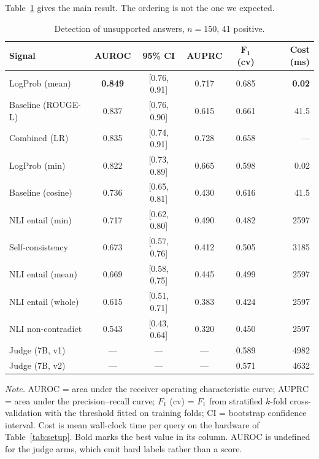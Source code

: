 \documentclass[11pt,a4paper]{article}
\begin{document}
Table~\ref{tab:overall} gives the main result. The ordering is not the one we
expected.

\begin{table}[htbp]
\centering
\caption{Detection of unsupported answers, $n = 150$, 41 positive.}
\label{tab:overall}
\small
\begin{tabular}{@{}lccccr@{}}
\toprule
\textbf{Signal} & \textbf{AUROC} & \textbf{95\% CI} & \textbf{AUPRC} &
$\boldsymbol{F_1}$ \textbf{(cv)} & \textbf{Cost (ms)} \\
\midrule
LogProb (mean)      & \textbf{0.849} & [0.76, 0.91] & 0.717 & 0.685 & \textbf{0.02} \\
Baseline (ROUGE-L)  & 0.837 & [0.76, 0.90] & 0.615 & 0.661 & 41.5 \\
Combined (LR)       & 0.835 & [0.74, 0.91] & 0.728 & 0.658 & --- \\
LogProb (min)       & 0.822 & [0.73, 0.89] & 0.665 & 0.598 & 0.02 \\
Baseline (cosine)   & 0.736 & [0.65, 0.81] & 0.430 & 0.616 & 41.5 \\
NLI entail (min)    & 0.717 & [0.62, 0.80] & 0.490 & 0.482 & 2597 \\
Self-consistency    & 0.673 & [0.57, 0.76] & 0.412 & 0.505 & 3185 \\
NLI entail (mean)   & 0.669 & [0.58, 0.75] & 0.445 & 0.499 & 2597 \\
NLI entail (whole)  & 0.615 & [0.51, 0.71] & 0.383 & 0.424 & 2597 \\
NLI non-contradict  & 0.543 & [0.43, 0.64] & 0.320 & 0.450 & 2597 \\
\midrule
Judge (7B, v1)      & ---   & ---          & ---   & 0.589 & 4982 \\
Judge (7B, v2)      & ---   & ---          & ---   & 0.571 & 4632 \\
\bottomrule
\end{tabular}
\smallskip
\begin{minipage}{\linewidth}
\footnotesize \raggedright
\textit{Note.} AUROC = area under the receiver operating characteristic curve; AUPRC = area under the precision--recall curve; $F_1$ (cv) = $F_1$ from stratified $k$-fold cross-validation with the threshold fitted on training folds; CI = bootstrap confidence interval. Cost is mean wall-clock time per query on the hardware of Table~\ref{tab:setup}. Bold marks the best value in its column. AUROC is undefined for the judge arms, which emit hard labels rather than a score.
\end{minipage}
\end{table}
\end{document}
